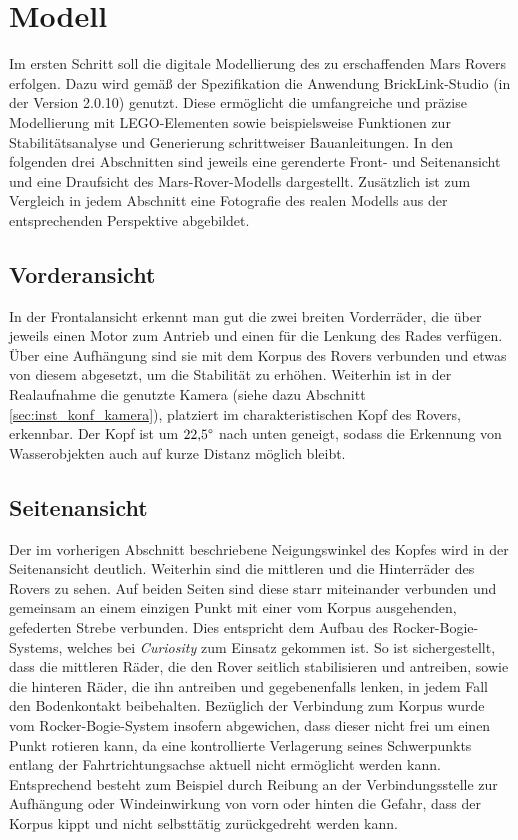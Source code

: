 \chapter{Modell}
\label{chp:Modell}

Im ersten Schritt soll die digitale Modellierung des zu erschaffenden Mars Rovers erfolgen.
Dazu wird gemäß der Spezifikation die Anwendung BrickLink-Studio (in der Version 2.0.10) genutzt.
Diese ermöglicht die umfangreiche und präzise Modellierung mit LEGO-Elementen sowie beispielsweise Funktionen zur Stabilitätsanalyse und Generierung schrittweiser Bauanleitungen.
In den folgenden drei Abschnitten sind jeweils eine gerenderte Front- und Seitenansicht und eine Draufsicht des Mars-Rover-Modells dargestellt.
Zusätzlich ist zum Vergleich in jedem Abschnitt eine Fotografie des realen Modells aus der entsprechenden Perspektive abgebildet.

\section{Vorderansicht}
\label{sec:voderansicht}


In der Frontalansicht erkennt man gut die zwei breiten Vorderräder, die über jeweils einen Motor zum Antrieb und einen für die Lenkung des Rades verfügen.
Über eine Aufhängung sind sie mit dem Korpus des Rovers verbunden und etwas von diesem abgesetzt, um die Stabilität zu erhöhen.
Weiterhin ist in der Realaufnahme die genutzte Kamera (siehe dazu Abschnitt \ref{sec:inst_konf_kamera}), platziert im charakteristischen Kopf des Rovers, erkennbar.
Der Kopf ist um $22{,}5 \degree$ nach unten geneigt, sodass die Erkennung von Wasserobjekten auch auf kurze Distanz möglich bleibt.

\section{Seitenansicht}
\label{sec:seitenansicht}

Der im vorherigen Abschnitt beschriebene Neigungswinkel des Kopfes wird in der Seitenansicht deutlich.
Weiterhin sind die mittleren und die Hinterräder des Rovers zu sehen.
Auf beiden Seiten sind diese starr miteinander verbunden und gemeinsam an einem einzigen Punkt mit einer vom Korpus ausgehenden, gefederten Strebe verbunden.
Dies entspricht dem Aufbau des Rocker-Bogie-Systems, welches bei \textit{Curiosity} zum Einsatz gekommen ist.
So ist sichergestellt, dass die mittleren Räder, die den Rover seitlich stabilisieren und antreiben, sowie die hinteren Räder, die ihn antreiben und gegebenenfalls lenken, in jedem Fall den Bodenkontakt beibehalten.
Bezüglich der Verbindung zum Korpus wurde vom Rocker-Bogie-System insofern abgewichen, dass dieser nicht frei um einen Punkt rotieren kann, da eine kontrollierte Verlagerung seines Schwerpunkts entlang der Fahrtrichtungsachse aktuell nicht ermöglicht werden kann.
Entsprechend besteht zum Beispiel durch Reibung an der Verbindungsstelle zur Aufhängung oder Windeinwirkung von vorn oder hinten die Gefahr, dass der Korpus kippt und nicht selbsttätig zurückgedreht werden kann.


